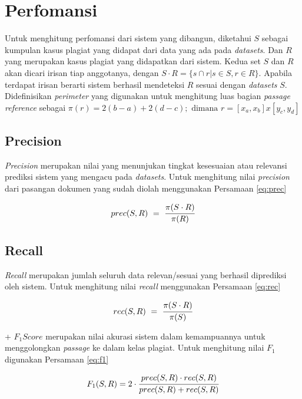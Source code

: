 \documentclass[../Proposal.tex]{subfiles}
\begin{document}
\section{Perfomansi}
Untuk menghitung perfomansi\cite{mcs,tira} dari sistem yang dibangun, diketahui $S$ sebagai kumpulan kasus plagiat yang didapat dari data yang ada pada \textit{datasets}. Dan $R$ yang merupakan kasus plagiat yang didapatkan dari sistem. Kedua set $S$ dan $R$ akan dicari irisan tiap anggotanya, dengan $S \cdot R = \{s \cap r | s \in S, r \in R\}$. Apabila terdapat irisan berarti sistem berhasil mendeteksi $R$ sesuai dengan \textit{datasets} $S$. \\

\noindent Didefinisikan \textit{perimeter} yang digunakan untuk menghitung luas bagian \textit{passage reference} sebagai $\pi(r) = 2(b-a) + 2(d-c);  \text{ dimana } r = [x_{a}, x_{b}] x [y_{c}, y_{d}] $

\subsection{Precision}
\textit{Precision} merupakan nilai yang menunjukan tingkat kesesuaian atau relevansi prediksi sistem yang mengacu pada \textit{datasets}. Untuk menghitung nilai \textit{precision} dari pasangan dokumen yang sudah diolah menggunakan Persamaan \ref{eq:prec}
\begin{center}
	\begin{equation}
		prec(S,R)\ =\ \cfrac{\pi(S\cdot R)}{\pi(R)}
		\label{eq:prec}
	\end{equation}
\end{center}


\subsection{Recall}
\textit{Recall} merupakan jumlah seluruh data relevan/sesuai yang berhasil diprediksi oleh sistem. Untuk menghitung nilai \textit{recall} menggunakan Persamaan \ref{eq:rec}
\begin{center}
	\begin{equation}
		rec(S,R)\ =\ \cfrac{\pi(S\cdot R)}{\pi(S)}
		\label{eq:rec}
	\end{equation}
\end{center}+
$F_{1} Score$ merupakan nilai akurasi sistem dalam kemampuannya untuk menggolongkan \textit{passage} ke dalam kelas plagiat. Untuk menghitung nilai $F_{1}$ digunakan Persamaan \ref{eq:f1}
\begin{center}
	\begin{equation}
	F_{1}(S,R) = 2 \cdot \cfrac{prec(S,R) \cdot rec(S,R)}{prec(S,R) + rec(S,R)}
	\label{eq:f1}
	\end{equation}
\end{center}
\end{document}
